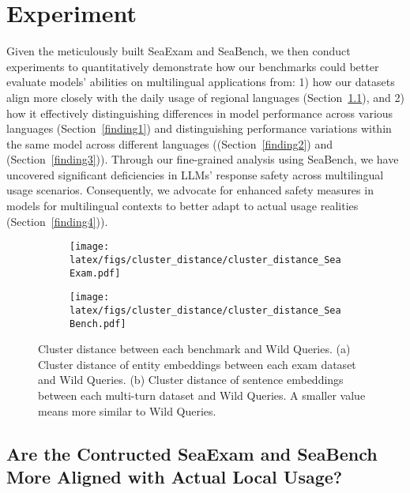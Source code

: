 \section{Experiment}
Given the meticulously built SeaExam and SeaBench, we then conduct experiments to quantitatively demonstrate how our benchmarks could better evaluate models' abilities on multilingual applications from: 1) how our datasets align more closely with the daily usage of regional languages (Section~\ref{subsection is_more_aligned}), and 2) how it effectively distinguishing differences in model performance across various languages (Section~\ref{finding1}) and distinguishing performance variations within the same model across different languages ((Section~\ref{finding2}) and (Section~\ref{finding3})). Through our fine-grained analysis using SeaBench, we have uncovered significant deficiencies in LLMs' response safety across multilingual usage scenarios. Consequently, we advocate for enhanced safety measures in models for multilingual contexts to better adapt to actual usage realities (Section~\ref{finding4})).


\begin{figure*}[!ht]
    \centering
    \begin{subfigure}[b]{0.48\linewidth}
        \centering
        \texttt{[image: latex/figs/cluster\_distance/cluster\_distance\_SeaExam.pdf]}
        \caption{}
        \label{subfig:seaexam_example}
    \end{subfigure}
    \begin{subfigure}[b]{0.48\linewidth}
        \centering
        \texttt{[image: latex/figs/cluster\_distance/cluster\_distance\_SeaBench.pdf]}
        \caption{}
        \label{subfig:seabench_example}
    \end{subfigure}
    \caption{Cluster distance between each benchmark and Wild Queries. (a) Cluster distance of entity embeddings between each exam dataset and Wild Queries. (b) Cluster distance of sentence embeddings between each multi-turn dataset and Wild Queries.  A smaller value means more similar to Wild Queries.}
    \label{fig:cluster_distance}
\end{figure*}


\subsection{Are the Contructed SeaExam and SeaBench More Aligned with Actual Local Usage?}\label{subsection is_more_aligned}

